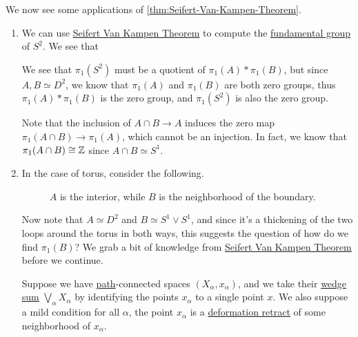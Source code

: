 \begin{eg}
	We now see some applications of \autoref{thm:Seifert-Van-Kampen-Theorem}.
	\begin{enumerate}
		\item We can use \hyperref[thm:Seifert-Van-Kampen-Theorem]{Seifert Van Kampen Theorem} to compute the \hyperref[def:fundamental-group]{fundamental group}
		      of \(S^{2}\). We see that
		      \begin{figure}[H]
			      \centering
			      \label{fig:lec11-eg:2-sphere}
		      \end{figure}
		      We see that \(\pi _1(S^{2} )\) must be a quotient of \(\pi _1(A)\ast \pi _1(B)\), but since \(A, B\simeq D^{2} \), we know that
		      \(\pi _1(A)\) and \(\pi _1(B)\) are both zero groups, thus \(\pi _1(A)\ast \pi _1(B)\) is the zero group, and \(\pi _1(S^{2} )\) is
		      also the zero group.
		      \begin{remark}
			      Note that the inclusion of \(A\cap B\to A\) induces the zero map \(\pi _1(A\cap B)\to \pi _1(A)\), which cannot be an injection.
			      In fact, we know that \(\pi _1(A\cap B)\cong \mathbb{\MakeUppercase{z}} \) since \(A\cap B\simeq S^1\).
		      \end{remark}
		\item \label{lec11:eg:torus} In the case of torus, consider the following.
		      \begin{figure}[H]
			      \centering
			      \caption{\(A\) is the interior, while \(B\) is the neighborhood of the boundary.}
			      \label{fig:lec11-eg2:torus}
		      \end{figure}
		      Now note that \(A\simeq D^{2} \) and \(B\simeq S^1\vee S^1\), and since it's a thickening of the two loops around the torus in
		      both ways, this suggests the question of how do we find \(\pi _1(B)\)? We grab a bit of knowledge from \hyperref[thm:Seifert-Van-Kampen-Theorem]{Seifert Van Kampen Theorem}
		      before we continue.

		      \hr

		      \begin{exercise}
			      Suppose we have \hyperref[def:path]{path}-connected spaces \((X_\alpha , x_\alpha )\), and we take their \hyperref[sssec:Wedge-sum]{wedge sum} \(\bigvee_\alpha X_\alpha \) by
			      identifying the points \(x_\alpha \) to a single point \(x\). We also suppose a mild condition for all \(\alpha\), the point
			      \(x_\alpha \) is a \hyperref[def:deformation-retraction]{deformation retract} of some neighborhood of \(x_\alpha \).


\end{exercise}
\end{enumerate}
\end{eg}
